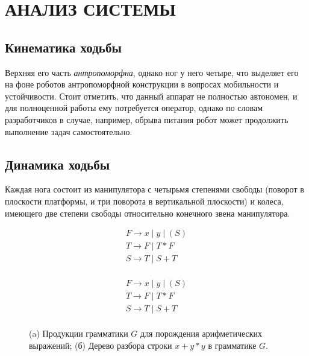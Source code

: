 \chapter{\MakeUppercase{Анализ системы}}
\section{Кинематика ходьбы}

Верхняя его часть \textit{антропоморфна}, однако ног у него четыре, что выделяет его на фоне роботов антропоморфной конструкции в вопросах мобильности и устойчивости. \cite{Hwangbo2019} Стоит отметить, что данный аппарат не полностью автономен, и для полноценной работы ему потребуется оператор, однако по словам разработчиков в случае, например, обрыва питания робот может продолжить выполнение задач самостоятельно. 

\section{Динамика ходьбы}

Каждая нога состоит из манипулятора с четырьмя степенями свободы (поворот в плоскости платформы, и три поворота в вертикальной плоскости) и колеса, имеющего две степени свободы относительно конечного звена манипулятора. \cite{Seok2012}

\begin{figure}[ht]
    \centering
        \begin{subfigure}[b]{0.3\textwidth}
        \centering
            $$\begin{array}{l}
            F \to x \;|\; y \;|\; (S) \\
            T \to F \;|\; T \ast F \\
            S \to T \;|\; S + T \\    
            \end{array}$$
            \caption{}
        \end{subfigure} %
        \begin{subfigure}[b]{0.6\textwidth}
        \centering
            $$\begin{array}{l}
            F \to x \;|\; y \;|\; (S) \\
            T \to F \;|\; T \ast F \\
            S \to T \;|\; S + T \\    
            \end{array}$$
            \caption{}
        \end{subfigure}
        
        \caption{(a) Продукции грамматики $G$ для порождения арифметических выражений; 
                    (б) Дерево разбора строки $x+y\ast y$ в грамматике $G$.}
        
        \label{fig_parsetree}
    \end{figure}


